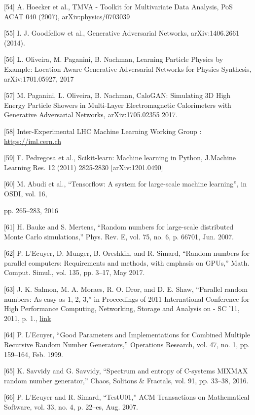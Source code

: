 \documentclass[12pt,a4paper]{article}
\begin{document}
{[}54{]} A. Hoecker et al., TMVA - Toolkit for Multivariate Data
Analysis, PoS ACAT 040 (2007), arXiv:physics/0703039

{[}55{]} I. J. Goodfellow et al., Generative Adversarial Networks,
arXiv:1406.2661 (2014).

{[}56{]} L. Oliveira, M. Paganini, B. Nachman, Learning Particle Physics
by Example: Location-Aware Generative Adversarial Networks for Physics
Synthesis, arXiv:1701.05927, 2017

{[}57{]} M. Paganini, L. Oliveira, B. Nachman, CaloGAN: Simulating 3D
High Energy Particle Showers in Multi-Layer Electromagnetic Calorimeters
with Generative Adversarial Networks, arXiv:1705.02355 2017.

{[}58{]} Inter-Experimental LHC Machine Learning Working Group :
\href{https://iml.cern.ch}{{https://iml.cern.ch}}

{[}59{]} F. Pedregosa et al., Scikit-learn: Machine learning in Python,
J.Machine Learning Res. 12 (2011) 2825-2830 {[}arXiv:1201.0490{]}

{[}60{]} M. Abudi et al., ``Tensorflow: A system for large-scale machine
learning'', in OSDI, vol. 16,

pp. 265--283, 2016

{[}61{]} H. Bauke and S. Mertens, ``Random numbers for large-scale
distributed Monte Carlo simulations,'' Phys. Rev. E, vol. 75, no. 6, p.
66701, Jun. 2007.

{[}62{]} P. L'Ecuyer, D. Munger, B. Oreshkin, and R. Simard, ``Random
numbers for parallel computers: Requirements and methods, with emphasis
on GPUs,'' Math. Comput. Simul., vol. 135, pp. 3--17, May 2017.

{[}63{]} J. K. Salmon, M. A. Moraes, R. O. Dror, and D. E. Shaw,
``Parallel random numbers: As easy as 1, 2, 3,'' in Proceedings of 2011
International Conference for High Performance Computing, Networking,
Storage and Analysis on - SC '11, 2011, p. 1.,
\href{http://dl.acm.org/citation.cfm?id=2063405\&CFID=810701954\&CFTOKEN=31644804}{{link}}

{[}64{]} P. L'Ecuyer, ``Good Parameters and Implementations for Combined
Multiple Recursive Random Number Generators,'' Operations Research, vol.
47, no. 1, pp. 159--164, Feb. 1999.

{[}65{]} K. Savvidy and G. Savvidy, ``Spectrum and entropy of C-systems
MIXMAX random number generator,'' Chaos, Solitons \& Fractals, vol. 91,
pp. 33--38, 2016.

{[}66{]} P. L'Ecuyer and R. Simard, ``TestU01,'' ACM Transactions on
Mathematical Software, vol. 33, no. 4, p. 22--es, Aug. 2007.
\end{document}
